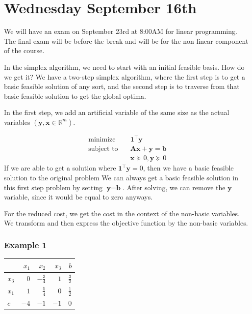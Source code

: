 \documentclass[11pt]{article}
\begin{document}
\section{Wednesday September 16th}
We will have an exam on September 23rd at 8:00AM for linear programming.
The final exam will be before the break and will be for the non-linear component of the course.

In the simplex algorithm, we need to start with an initial feasible basis.
How do we get it?
We have a two-step simplex algorithm, where the first step is to get a basic feasible solution of any sort, and the second step is to traverse from that basic feasible solution to get the global optima.

In the first step, we add an artificial variable of the same size as the actual variables $(\mathbf{y}, \mathbf{x} \in \mathbb{R}^m )$.

\begin{align}
  \text{minimize} & \quad \textbf{1}^\top \textbf{y} \\
  \text{subject to} & \quad \textbf{A} \textbf{x} + \textbf{y} = \textbf{b} \\
  & \quad \textbf{x} \succeq 0,  \textbf{y} \succeq 0
\end{align}
If we are able to get a solution where $\textbf{1}^\top \textbf{y} = 0$, then we have a basic feasible solution to the original problem
We can always get a basic feasible solution in this first step problem by setting $\textbf{y} = \textbf{b}$.
After solving, we can remove the $\textbf{y}$ variable, since it would be equal to zero anyways.

For the reduced cost, we get the cost in the context of the non-basic variables.
We transform and then express the objective function by the non-basic variables.
\subsubsection{Example 1}
\begin{center}
\begin{tabular}{c|rrrr}
    & $x_1$ & $x_2$ & $x_3$ & $b$ \\
\hline
$x_3$ & $0$ & $-\frac{3}{4}$ & $1$ & $\frac{3}{2}$ \\
$x_1$ & $1$ & $\frac{5}{4}$ & $0$ & $\frac{1}{2}$ \\
\hline
$c^\top$ & $-4$ & $-1$ & $-1$ & $0$
\end{tabular}
\end{center}
\end{document}
